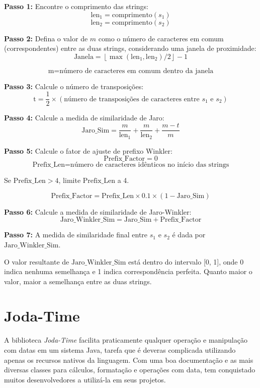 \documentclass[
	12pt,			%
	openright,		%
	oneside,	
	a4paper,		%
	english,		%
	brazil			%
]{abntex2/abntex2}  %
\begin{document}
			\noindent
			\textbf{Passo 1:} Encontre o comprimento das strings:
			\[
			\text{len}_1 = \text{comprimento}(s_1)
			\]
			\[
			\text{len}_2 = \text{comprimento}(s_2)
			\]
			
			\noindent
			\textbf{Passo 2:} Defina o valor de $m$ como o número de caracteres em comum (correspondentes) entre as duas strings, considerando uma janela de proximidade:
			\[
			\text{Janela} = \left\lfloor\max(\text{len}_1, \text{len}_2) / 2\right\rfloor - 1
			\]
			
			\[
			\text{m} = \text{número de caracteres em comum dentro da janela}
			\]
			
			\noindent
			\textbf{Passo 3:} Calcule o número de transposições:
			\[
			\text{t} = \frac{1}{2} \times \left(\text{número de transposições de caracteres entre $s_1$ e $s_2$}\right)
			\]
			
			\noindent
			\textbf{Passo 4:} Calcule a medida de similaridade de Jaro:
			\[
			\text{Jaro\_Sim} = \frac{m}{\text{len}_1} + \frac{m}{\text{len}_2} + \frac{m - t}{m}
			\]
			
			\noindent
			\textbf{Passo 5:} Calcule o fator de ajuste de prefixo Winkler:
			\[
			\text{Prefix\_Factor} = 0
			\]
			\[
			\text{Prefix\_Len} = \text{número de caracteres idênticos no início das strings}
			\]
			
			Se $\text{Prefix\_Len} > 4$, limite $\text{Prefix\_Len}$ a 4.
			
			\[
			\text{Prefix\_Factor} = \text{Prefix\_Len} \times 0.1 \times (1 - \text{Jaro\_Sim})
			\]
			
			\noindent
			\textbf{Passo 6:} Calcule a medida de similaridade de Jaro-Winkler:
			\[
			\text{Jaro\_Winkler\_Sim} = \text{Jaro\_Sim} + \text{Prefix\_Factor}
			\]
			
			\noindent
			\textbf{Passo 7:} A medida de similaridade final entre $s_1$ e $s_2$ é dada por $\text{Jaro\_Winkler\_Sim}$.
			
			O valor resultante de $\text{Jaro\_Winkler\_Sim}$ está dentro do intervalo [0, 1], onde 0 indica nenhuma semelhança e 1 indica correspondência perfeita. Quanto maior o valor, maior a semelhança entre as duas strings.
			
		\section{Joda-Time}
			
			A biblioteca \textit{Joda-Time} \cite{joda-time} facilita praticamente qualquer operação e manipulação com datas em um sistema Java, tarefa que é deveras complicada utilizando apenas os recursos nativos da linguagem. Com uma boa documentação e as mais diversas classes para cálculos, formatação e operações com data, tem conquistado muitos desenvolvedores a utilizá-la em seus projetos.
			
\end{document}
